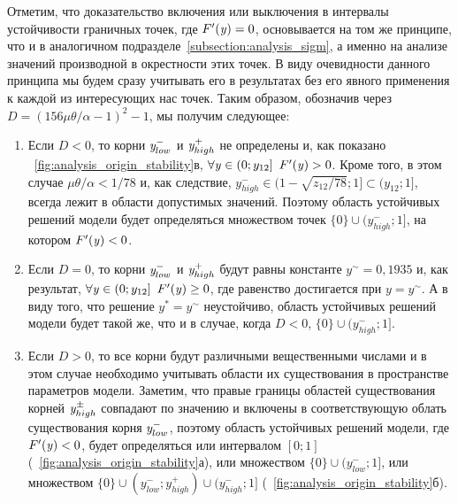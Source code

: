 Отметим, что доказательство включения или выключения в интервалы устойчивости граничных точек, где $F^{\prime}(\mathit{y}) = 0$, основывается на том же принципе, что и в аналогичном подразделе~\autoref{subsection:analysis_sigm}, а именно на анализе значений производной в окрестности этих точек. В виду очевидности данного принципа мы будем сразу учитывать его в результатах без его явного применения к каждой из интересующих нас точек. Таким образом, обозначив через $D = \left( 156 \mu \theta / \alpha - 1\right)^{2} - 1$, мы получим следующее:
\begin{enumerate}[wide]
    \item Если $D < 0$, то корни $\mathit{y}^{-}_{low}$ и $\mathit{y}^{+}_{high}$ не определены и, как показано \onfigure~\ref{fig:analysis_origin_stability}в, $\forall\scalar{y} \in \left(0; y_{12}\right]\ F^{\prime}(\scalar{y}) > 0$. Кроме того, в этом случае $\mu \theta / \alpha < 1 / 78$ и, как следствие, $y_{high}^{-} \in (1 - \sqrt{z_{12} / 78}; 1] \subset (y_{12}; 1]$, \ie всегда лежит в области допустимых значений. Поэтому область устойчивых решений модели будет определяться множеством точек $\{0\} \cup (y_{high}^{-}; 1]$, на котором $F^{\prime}(\mathit{y}) < 0$.
    \item Если $D = 0$, то корни $\mathit{y}^{-}_{low}$ и $\mathit{y}^{+}_{high}$ будут равны константе $y^{\sim} = 0,1935$ и, как результат, $\forall\mathit{y} \in \left(0; y_{12}\right]\ F^{\prime}(\mathit{y}) \ge 0$, где равенство достигается при $y = y^{\sim}$. А в виду того, что решение $y^{*} = y^{\sim}$ неустойчиво, область устойчивых решений модели будет такой же, что и в случае, когда $D < 0$, \ie $\{0\} \cup (y_{high}^{-}; 1]$.
    \item Если $D > 0$, то все корни будут различными вещественными числами и в этом случае необходимо учитывать области их существования в пространстве параметров модели. Заметим, что правые границы областей существования корней $\mathit{y}^{\pm}_{high}$ совпадают по значению и включены в соответствующую облать существования корня $\mathit{y}^{-}_{low}$, поэтому область устойчивых решений модели, где $F^{\prime}(\mathit{y}) < 0$, будет определяться или интервалом $[0; 1]$ (\seefigure~\ref{fig:analysis_origin_stability}а), или множеством $\{0\} \cup (y_{low}^{-}; 1]$, или множеством $\{0\} \cup (y_{low}^{-}; y_{high}^{+}) \cup (y_{high}^{-}; 1]$ (\seefigure~\ref{fig:analysis_origin_stability}б).
\end{enumerate}


